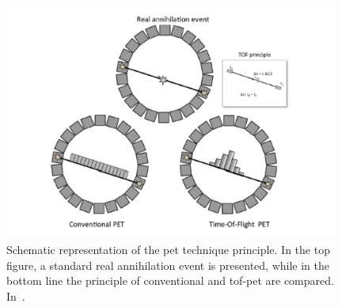 \begin{figure}[!htbp]
\centering
\includegraphics[width=0.98\textwidth]{03_GraphicFiles/chapter1_Introduction/PET_concept.pdf}
\caption{Schematic representation of the \gls{pet} technique principle. In the top figure, a standard real annihilation event is presented, while in the bottom line the principle of conventional and \gls{tof}-\gls{pet} are compared. In~\cite{Vandenberghe2016 }.}
\label{chap1::fig::PETconcept}
\end{figure}   

